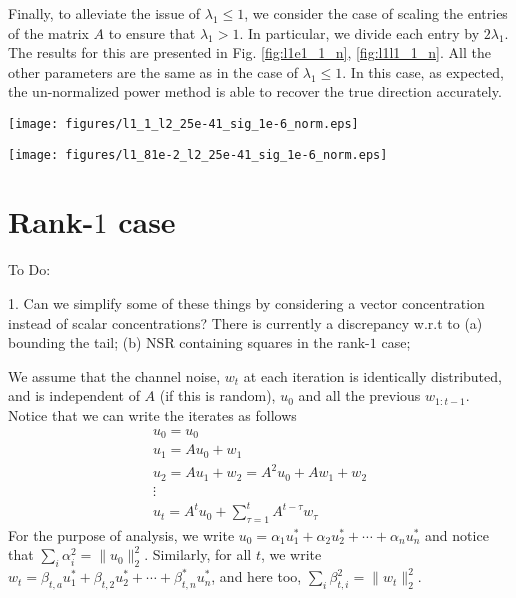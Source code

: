 \documentclass[10pt]{article}
\newcommand{\nsrmax}{\text{NSR}}
\begin{document}
Finally, to alleviate the issue of $\lambda_1 \leq 1$, we consider the case of scaling the entries of the matrix $A$ to ensure that $\lambda_1 > 1$. In particular, we divide each entry by $2\lambda_1$. The results for this are presented in Fig. \ref{fig:l1e1_1_n}, \ref{fig:l1l1_1_n}. All the other parameters are the same as in the case of $\lambda_1 \leq 1$. In this case, as expected, the un-normalized power method is able to recover the true direction accurately. 

\begin{minipage}[t]{.5\linewidth}
\centering
\texttt{[image: figures/l1\_1\_l2\_25e-41\_sig\_1e-6\_norm.eps]}
\label{fig:l1e1_1_n}
\end{minipage}%
\begin{minipage}[t]{.5\linewidth}
\centering
\texttt{[image: figures/l1\_81e-2\_l2\_25e-41\_sig\_1e-6\_norm.eps]}
\label{fig:l1l1_1_n}
\end{minipage}




\section{Rank-$1$ case}

{\color{red} 
To Do:

1. Can we simplify some of these things by considering a vector concentration instead of scalar concentrations? There is currently a discrepancy w.r.t to (a) bounding the tail; (b) $\nsrmax$ containing squares in the rank-$1$ case;

}

We assume that the channel noise, $w_t$ at each iteration is identically distributed, and is independent of $A$ (if this is random), $u_0$ and all the previous $w_{1:t-1}$. Notice that we can write the iterates as follows
\begin{gather*}
u_0 = u_0 \\
u_1 = A u_0 + w_1 \\
u_2 = A u_1 + w_2 = A^2 u_0 + A w_1 + w_2\\
\vdots \\
u_t = A^t u_0 + \sum_{\tau = 1}^t A^{t-\tau} w_\tau
\end{gather*}
For the purpose of analysis, we write $u_0 = \alpha_1 u_1^* + \alpha_2 u_2^* + \cdots + \alpha_n u_n^*$ and notice that $\sum_i \alpha_i^2 = \|u_0\|_2^2$. Similarly, for all $t$, we write $w_t = \beta_{t,a} u_1^* + \beta_{t,2} u_2^* +  \cdots + \beta_{t,n}^* u_n^*$, and here too, $\sum_i \beta_{t,i}^2 = \|w_t\|_2^2$. 
\end{document}
